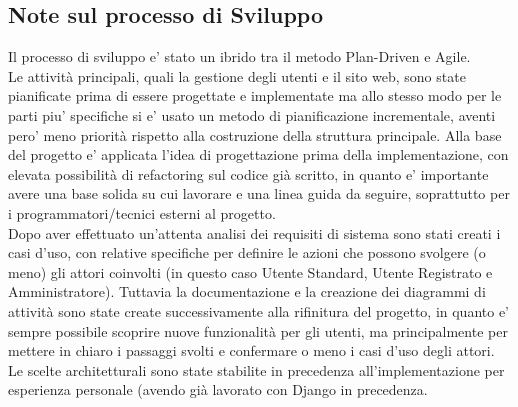 \documentclass[a4paper, 10pt]{article}
\begin{document}
	\subsection{Note sul processo di Sviluppo}
		Il processo di sviluppo e' stato un ibrido tra il metodo Plan-Driven e Agile. 
		\\Le attività principali, quali la gestione degli utenti e il sito web, sono state
		 pianificate prima di essere progettate e implementate ma allo stesso modo 
		 per le parti piu' specifiche 
		si e' usato un metodo di pianificazione incrementale, aventi pero' meno priorità 
		rispetto alla costruzione della struttura principale. Alla base del progetto e' 
		applicata l'idea di progettazione prima della implementazione, con elevata 
		possibilità di refactoring sul codice già scritto, in quanto e' importante 
		avere una base solida su cui 
		lavorare e una linea guida da seguire, soprattutto per i programmatori/tecnici 
		esterni al progetto. \\ 
		Dopo aver effettuato un'attenta analisi dei requisiti 
		di sistema sono stati creati i casi d'uso,
		con relative specifiche per definire le azioni che 
		possono svolgere (o meno) gli attori coinvolti 
		(in questo caso Utente Standard, Utente Registrato e Amministratore). 
		Tuttavia la documentazione e la creazione dei diagrammi di 
		attività sono state create successivamente alla rifinitura del
		progetto, in quanto e' sempre possibile scoprire nuove funzionalità per 
		gli utenti, ma principalmente per mettere in chiaro i passaggi svolti e 
		confermare o meno i casi d'uso degli attori. \\
		Le scelte architetturali sono state stabilite in precedenza all'implementazione 
		per esperienza personale (avendo già lavorato con Django in precedenza. 
\end{document}
